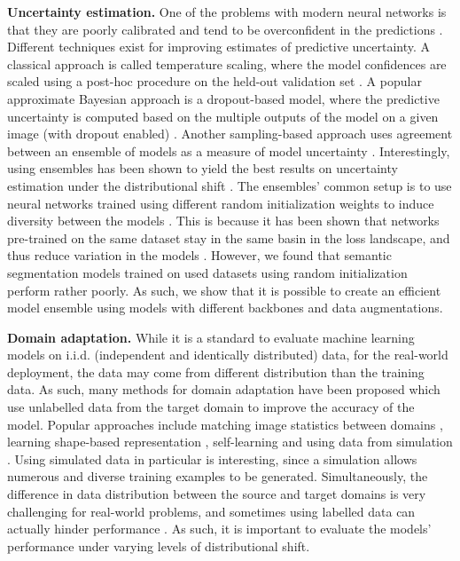 \documentclass[conference]{IEEEtran}
\begin{document}
\textbf{Uncertainty estimation.}
One of the problems with modern neural networks is that they are poorly calibrated and tend to be overconfident in the predictions \cite{calibration}. Different techniques exist for improving estimates of predictive uncertainty. A classical approach is called temperature scaling, where the model confidences are scaled using a post-hoc procedure on the held-out validation set \cite{temperature}. A popular approximate Bayesian approach is a dropout-based model, where the predictive uncertainty is computed based on the multiple outputs of the model on a given image (with dropout enabled) \cite{Gal}. Another sampling-based approach uses agreement between an ensemble of models as a measure of model uncertainty \cite{ensemble}. Interestingly, using ensembles has been shown to yield the best results on uncertainty estimation under the distributional shift \cite{trustuncertainty, ensemblesuncertainty}. 
The ensembles' common setup is to use neural networks trained using different random initialization weights to induce diversity between the models \cite{ensembles_1990}. This is because it has been shown that networks pre-trained on the same dataset stay in the same basin in the loss landscape, and thus reduce variation in the models \cite{TODOnipstransfer}. However, we found that semantic segmentation models trained on used datasets using random initialization perform rather poorly. As such, we show that it is possible to create an efficient model ensemble using models with different backbones and data augmentations.

\textbf{Domain adaptation.}
While it is a standard to evaluate machine learning models on i.i.d. (independent and identically distributed) data, for the real-world deployment, the data may come from different distribution than the training data. As such, many methods for domain adaptation have been proposed which use unlabelled data from the target domain to improve the accuracy of the model. Popular approaches include matching image statistics between domains \cite{histogram}, learning shape-based representation \cite{textureinvariant}, self-learning \cite{textureinvariant} and using data from simulation \cite{james2019simtoreal, synthetic}. 
Using simulated data in particular is interesting, since a simulation allows numerous and diverse training examples to be generated. Simultaneously, the difference in data distribution between the source and target domains is very challenging for real-world problems, and sometimes using labelled data can actually hinder performance \cite{todorealistic}. As such, it is important to evaluate the models’ performance under varying levels of distributional shift.
\end{document}
